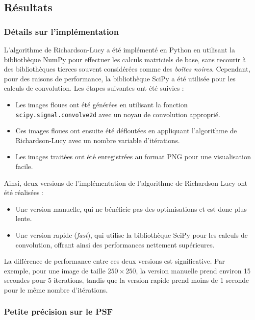 \subsection{Résultats}

\subsubsection{Détails sur l'implémentation}

L'algorithme de Richardson-Lucy a été implémenté en Python en utilisant la bibliothèque NumPy pour effectuer les calculs matriciels de base, sans recourir à des bibliothèques tierces souvent considérées comme des \textit{boîtes noires}. Cependant, pour des raisons de performance, la bibliothèque SciPy a été utilisée pour les calculs de convolution. Les étapes suivantes ont été suivies :

\begin{itemize}
    \item Les images floues ont été générées en utilisant la fonction \texttt{scipy.signal.convolve2d} avec un noyau de convolution approprié.
    \item Ces images floues ont ensuite été défloutées en appliquant l'algorithme de Richardson-Lucy avec un nombre variable d'itérations.
    \item Les images traitées ont été enregistrées au format PNG pour une visualisation facile.
\end{itemize}

Ainsi, deux versions de l'implémentation de l'algorithme de Richardson-Lucy ont été réalisées :
\begin{itemize}
    \item Une version manuelle, qui ne bénéficie pas des optimisations et est donc plus lente.
    \item Une version rapide (\textit{fast}), qui utilise la bibliothèque SciPy pour les calculs de convolution, offrant ainsi des performances nettement supérieures.
\end{itemize}

La différence de performance entre ces deux versions est significative. Par exemple, pour une image de taille \( 250 \times 250 \), la version manuelle prend environ 15 secondes pour 5 iterations, tandis que la version rapide prend moins de 1 seconde pour le même nombre d'itérations.
\subsubsection{Petite précision sur le PSF}

